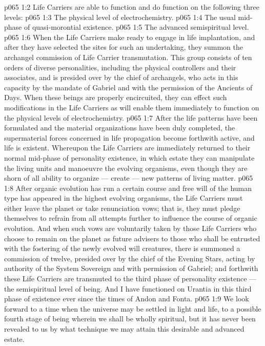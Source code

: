 \vs p065 1:2 Life Carriers are able to function and do function on the following three levels:
\vs p065 1:3 \bibnobreakspace The physical level of electrochemistry.
\vs p065 1:4 \bibnobreakspace The usual mid\hyp{}phase of quasi\hyp{}morontial existence.
\vs p065 1:5 \bibnobreakspace The advanced semispiritual level.
\vs p065 1:6 \pc When the Life Carriers make ready to engage in life implantation, and after they have selected the sites for such an undertaking, they summon the archangel commission of Life Carrier transmutation. This group consists of ten orders of diverse personalities, including the physical controllers and their associates, and is presided over by the chief of archangels, who acts in this capacity by the mandate of Gabriel and with the permission of the Ancients of Days. When these beings are properly encircuited, they can effect such modifications in the Life Carriers as will enable them immediately to function on the physical levels of electrochemistry.
\vs p065 1:7 After the life patterns have been formulated and the material organizations have been duly completed, the supermaterial forces concerned in life propagation become forthwith active, and life is existent. Whereupon the Life Carriers are immediately returned to their normal mid\hyp{}phase of personality existence, in which estate they can manipulate the living units and manoeuvre the evolving organisms, even though they are shorn of all ability to organize --- create --- new patterns of living matter.
\vs p065 1:8 After organic evolution has run a certain course and free will of the human type has appeared in the highest evolving organisms, the Life Carriers must either leave the planet or take renunciation vows; that is, they must pledge themselves to refrain from all attempts further to influence the course of organic evolution. And when such vows are voluntarily taken by those Life Carriers who choose to remain on the planet as future advisers to those who shall be entrusted with the fostering of the newly evolved will creatures, there is summoned a commission of twelve, presided over by the chief of the Evening Stars, acting by authority of the System Sovereign and with permission of Gabriel; and forthwith these Life Carriers are transmuted to the third phase of personality existence --- the semispiritual level of being. And I have functioned on Urantia in this third phase of existence ever since the times of Andon and Fonta.
\vs p065 1:9 We look forward to a time when the universe may be settled in light and life, to a possible fourth stage of being wherein we shall be wholly spiritual, but it has never been revealed to us by what technique we may attain this desirable and advanced estate.

